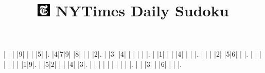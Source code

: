 \documentclass{article}
\title{\includegraphics{icons/nytimes-icon.png} NYTimes Daily Sudoku}
\author{}
\begin{document}
\maketitle

\begin{sudoku}
| | | |9| | | |5| |.
|4|7|9| |8| | | |2|.
| |3| |4| | | | | |.
| |1| | | |4| | | |.
| | | |2| |5|6| | |.
| | | | | | | |1|9|.
| |5|2| | | |4| |3|.
| | | | | | | | | |.
| | |3| | |6| | | |.
\end{sudoku}
\end{document}
